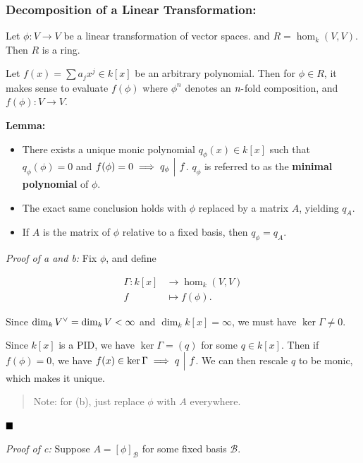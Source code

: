 \hypertarget{decomposition-of-a-linear-transformation}{%
\subsubsection{Decomposition of a Linear
Transformation:}\label{decomposition-of-a-linear-transformation}}

Let \(\phi: V \to V\) be a linear transformation of vector spaces. and
\(R = \hom_k(V, V)\). Then \(R\) is a ring.

Let \(f(x) = \sum a_j x^j \in k[x]\) be an arbitrary polynomial. Then
for \(\phi \in R\), it makes sense to evaluate \(f(\phi)\) where
\(\phi^n\) denotes an \(n{\hbox{-}}\)fold composition, and
\(f(\phi): V \to V\).

\textbf{Lemma:}

\begin{itemize}
\item
  There exists a unique monic polynomial \(q_\phi(x) \in k[x]\) such
  that \(q_\phi(\phi) = 0\) and
  \(f(\phi) = 0 \implies q_\phi {~\Bigm| ~} f\). \(q_\phi\) is referred to
  as the \textbf{minimal polynomial} of \(\phi\).
\item
  The exact same conclusion holds with \(\phi\) replaced by a matrix
  \(A\), yielding \(q_A\).
\item
  If \(A\) is the matrix of \(\phi\) relative to a fixed basis, then
  \(q_\phi = q_A\).
\end{itemize}

\emph{Proof of a and b:} Fix \(\phi\), and define

\begin{align*}
\Gamma: k[x] &\to \hom_k(V, V) \\
f &\mapsto f(\phi)
.\end{align*}

Since \(\dim_k V^\vee = \dim_k V < \infty\) and
\(\dim_k k[x] = \infty\), we must have \(\ker \Gamma \neq 0\).

Since \(k[x]\) is a PID, we have \(\ker \Gamma = (q)\) for some
\(q\in k[x]\). Then if \(f(\phi) = 0\), we have
\(f(x) \in \ker \Gamma \implies q {~\Bigm| ~} f\). We can then rescale
\(q\) to be monic, which makes it unique.

\begin{quote}
Note: for (b), just replace \(\phi\) with \(A\) everywhere.
\end{quote}

\(\qed\)

\emph{Proof of c:} Suppose \(A = [\phi]_\mathcal{B}\) for some fixed
basis \(\mathcal B\).

